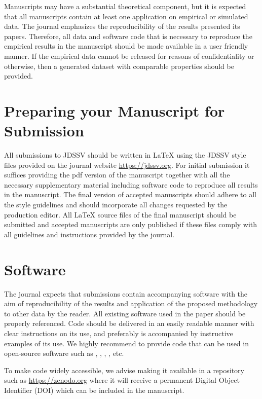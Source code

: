 \documentclass[article]{jdssv}
\begin{document}
Manuscripts may have a substantial theoretical component, but it is expected that all manuscripts contain at least one application on empirical or simulated data. The journal emphasizes the reproducibility of the results presented its papers. Therefore, all data and software code that is necessary to reproduce the empirical results in the manuscript should be made available in a user friendly manner. If the empirical data cannot be released for reasons of confidentiality or otherwise, then a generated dataset with comparable properties should be provided. 



\section[]{Preparing your Manuscript for Submission}

All submissions to JDSSV should be written in {\LaTeX} using the JDSSV style files provided on the journal website \url{https://jdssv.org}. For initial submission it suffices providing the pdf version of the manuscript together with all the necessary supplementary material including software code to reproduce all results in the manuscript. The final version of accepted manuscripts should adhere to all the style guidelines and should incorporate all changes requested by the production editor. All {\LaTeX}  source files of the final manuscript should be submitted and accepted manuscripts are only published if these files comply with all guidelines and instructions provided by the journal. 



\section[]{Software}

The journal expects that submissions contain accompanying
software with the aim of reproducibility of the results and application of the proposed methodology to other data by the reader.  All existing software used in the paper should be properly referenced. Code should be delivered in an easily readable manner with clear instructions on its use, and preferably is accompanied by instructive examples of its use. We highly recommend to provide code that can be used in open-source software such as  \citep{R},  \citep{python},  \citep{Julia},  \citep{octave}, etc. 

To make code widely accessible, we advise making it available in a repository such as \url{https://zenodo.org} where it will receive a permanent Digital Object Identifier (DOI) which can be included in the manuscript. 
\end{document}
